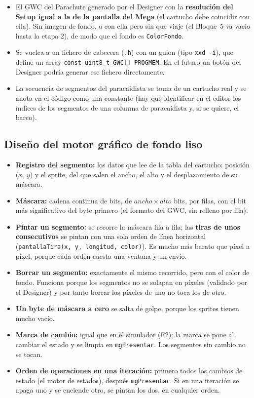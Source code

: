 \begin{itemize}
	\item El GWC del Parachute generado por el Designer con la \textbf{resolución del Setup igual a la de la pantalla del Mega} (el cartucho debe coincidir con ella). Sin imagen de fondo, o con ella pero sin que viaje (el Bloque~5 va vacío hasta la etapa 2), de modo que el fondo es \texttt{ColorFondo}.
	\item Se vuelca a un fichero de cabecera (\texttt{.h}) con un guion (tipo \texttt{xxd -i}), que define un array \texttt{const uint8\_t GWC[] PROGMEM}. En el futuro un botón del Designer podría generar ese fichero directamente.
	\item La secuencia de segmentos del paracaidista se toma de un cartucho real y se anota en el código como una constante (hay que identificar en el editor los índices de los segmentos de una columna de paracaidista y, si se quiere, el barco).
\end{itemize}

\subsection{Diseño del motor gráfico de fondo liso}
\label{sec:F6I02Grafico}

\begin{itemize}
	\item \textbf{Registro del segmento:} los datos que lee de la tabla del cartucho: posición ($x$, $y$) y el sprite, del que salen el ancho, el alto y el desplazamiento de su máscara.
	\item \textbf{Máscara:} cadena continua de bits, de $ancho\times alto$ bits, por filas, con el bit más significativo del byte primero (el formato del GWC, sin relleno por fila).
	\item \textbf{Pintar un segmento:} se recorre la máscara fila a fila; las \textbf{tiras de unos consecutivos} se pintan con una sola orden de línea horizontal (\texttt{pantallaTira(x, y, longitud, color)}). Es mucho más barato que píxel a píxel, porque cada orden cuesta una ventana y un envío.
	\item \textbf{Borrar un segmento:} exactamente el mismo recorrido, pero con el color de fondo. Funciona porque los segmentos no se solapan en píxeles (validado por el Designer) y por tanto borrar los píxeles de uno no toca los de otro.
	\item \textbf{Un byte de máscara a cero} se salta de golpe, porque los sprites tienen mucho vacío.
	\item \textbf{Marca de cambio:} igual que en el simulador (F2); la marca se pone al cambiar el estado y se limpia en \texttt{mgPresentar}. Los segmentos sin cambio no se tocan.
	\item \textbf{Orden de operaciones en una iteración:} primero todos los cambios de estado (el motor de estados), después \texttt{mgPresentar}. Si en una iteración se apaga uno y se enciende otro, se pintan los dos, en cualquier orden.
\end{itemize}

